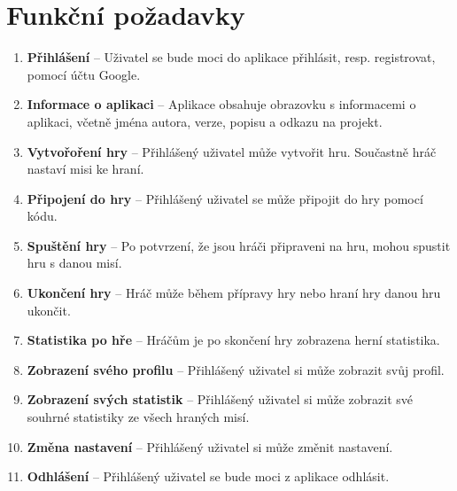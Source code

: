 \section{Funkční požadavky}

\begin{enumerate}[label=\textbf{F\arabic*}, ref=F\arabic*]
    \item \textbf{Přihlášení}
-- Uživatel se bude moci do aplikace přihlásit, resp. registrovat,
pomocí účtu Google.
    \item \textbf{Informace o aplikaci}
-- Aplikace obsahuje obrazovku s informacemi o aplikaci,
včetně jména autora, verze, popisu a odkazu na projekt.
    \item \textbf{Vytvořoření hry}
-- Přihlášený uživatel může vytvořit hru.
Součastně hráč nastaví misi ke hraní.
    \item \textbf{Připojení do hry}
-- Přihlášený uživatel se může připojit do hry pomocí kódu.
    \item \textbf{Spuštění hry}
-- Po potvrzení, že jsou hráči připraveni na hru,
mohou spustit hru s danou misí.
    \item \textbf{Ukončení hry}
-- Hráč může během přípravy hry nebo hraní hry danou hru ukončit.
    \item \textbf{Statistika po hře}
-- Hráčům je po skončení hry zobrazena herní statistika.
    \item \textbf{Zobrazení svého profilu}
-- Přihlášený uživatel si může zobrazit svůj profil.
    \item \textbf{Zobrazení svých statistik}
-- Přihlášený uživatel si může zobrazit své souhrné statistiky
ze všech hraných misí.
    \item\label{req:settings} \textbf{Změna nastavení}
-- Přihlášený uživatel si může změnit nastavení.
    \item\label{req:logout} \textbf{Odhlášení}
-- Přihlášený uživatel se bude moci z aplikace odhlásit.
\end{enumerate}
